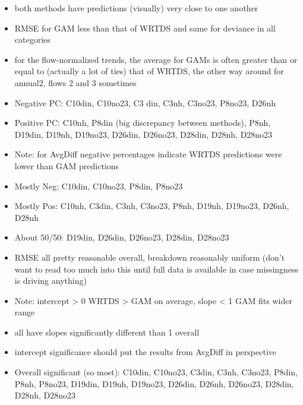 \documentclass[12pt]{amsart}
\begin{document}
\begin{itemize}
\item both methods have predictions (visually) very close to one another
\item RMSE for GAM less than that of WRTDS and same for deviance in all categories 
\item for the flow-normalized trends, the average for GAMs is often greater than or equal to (actually a lot of ties) that of WRTDS, the other way around for annual2, flows 2 and 3 sometimes 
\item Negative PC: C10din, C10no23, C3 din, C3nh, C3no23, P8no23, D26nh
\item Positive PC: C10nh, P8din (big discrepancy between methods), P8nh, D19din, D19nh, D19no23, D26din, D26no23, D28din, D28nh, D28no23
\item  Note: for  AvgDiff negative percentages indicate WRTDS predictions were lower than GAM predictions
\item Mostly Neg: C10din, C10no23, P8din, P8no23
\item Mostly Pos: C10nh, C3din, C3nh, C3no23, P8nh, D19nh, D19no23, D26nh, D28nh
\item About 50/50: D19din, D26din, D26no23, D28din, D28no23
\item RMSE all pretty reasonable overall, breakdown reasonably uniform (don't want to read too much into this until full data is available in case missingness is driving anything)
\item Note: intercept > 0 WRTDS > GAM on average, slope < 1 GAM fits wider range
\item all have slopes significantly different than 1 overall
\item intercept significance should put the results from AvgDiff in perspective
\item Overall significant (so most): C10din, C10no23, C3din, C3nh, C3no23, P8din, P8nh, P8no23, D19din, D19nh, D19no23, D26din, D26nh, D26no23, D28din, D28nh, D28no23
\end{itemize}
\end{document}
